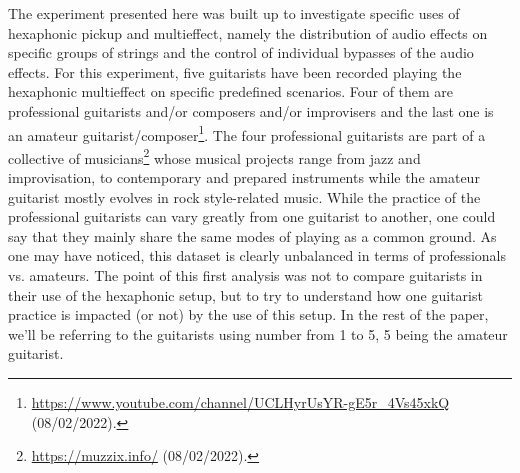 \documentclass{article}
\begin{document}
The experiment presented here was built up to investigate specific uses of hexaphonic pickup and multieffect, name\-ly the distribution of audio effects on specific groups of strings and the control of individual bypasses of the audio effects. 
For this experiment, five guitarists have been recorded playing the hexaphonic multieffect on specific predefined scenarios. Four of them are professional guitarists and/or composers and/or improvisers and the last one is an amateur guitarist/composer\footnote{\url{https://www.youtube.com/channel/UCLHyrUsYR-gE5r\_4Vs45xkQ} (08/02/2022).}. The four professional guitarists are part of a collective of musicians\footnote{\url{https://muzzix.info/} (08/02/2022).} whose musical pro\-jects range from jazz and improvisation, to contemporary and prepared instruments while the amateur guitarist mostly evolves in rock style-related music. While the practice of the professional guitarists can vary greatly from one guitarist to another, one could say that they mainly share the same modes of playing as a common ground. As one may have noticed, this dataset is clearly unbalanced in terms of professionals vs. amateurs. The point of this first analysis was not to compare guitarists in their use of the hexaphonic setup, but to try to understand how one guitarist practice is impacted (or not) by the use of this setup. In the rest of the paper, we'll be referring to the guitarists using number from 1 to 5, 5 being the amateur guitarist. 
\end{document}
